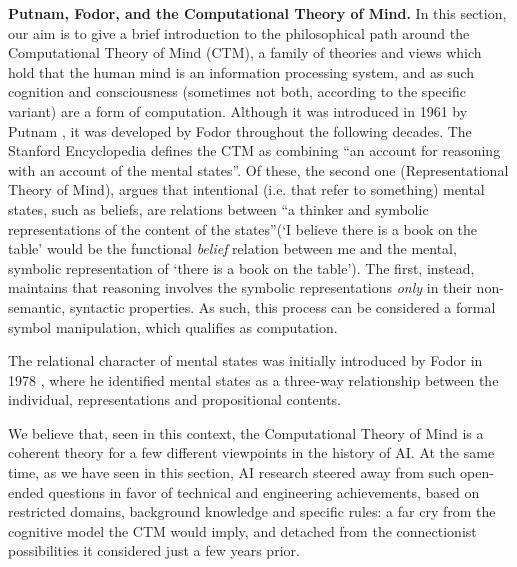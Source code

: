 \documentclass[../main.tex]{subfiles}
\begin{document}
\vspace{4pt}
\textbf{Putnam, Fodor, and the Computational Theory of Mind.}
In this section, our aim is to give a brief introduction to the philosophical path around the Computational Theory of Mind (CTM), a family of theories and views which hold that the human mind is an information processing system, and as such cognition and consciousness (sometimes not both, according to the specific variant) are a form of computation. Although it was introduced in 1961 by Putnam  \parencite{horstComputationalTheoryMind2003}, it was developed by Fodor throughout the following decades. The Stanford Encyclopedia defines the CTM as combining ``an account for reasoning with an account of the mental states''. Of these, the second one (Representational Theory of Mind), argues that intentional (i.e. that refer to something) mental states, such as beliefs, are relations between ``a thinker and symbolic representations of the content of the states''(`I believe there is a book on the table' would be the functional \textit{belief} relation between me and the mental, symbolic representation of `there is a book on the table'). The first, instead, maintains that reasoning involves the symbolic representations \textit{only} in their non-semantic, syntactic properties. As such, this process can be considered a formal symbol manipulation, which qualifies as computation.

The relational character of mental states was initially introduced by Fodor in 1978 \parencite{fodorPropositionalAttitudes1978}, where he identified mental states as a three-way relationship between the individual, representations and propositional contents.

\vspace{5pt}
We believe that, seen in this context, the Computational Theory of Mind is a coherent theory for a few different viewpoints in the history of AI. At the same time, as we have seen in this section, AI research steered away from such open-ended questions in favor of technical and engineering achievements, based on restricted domains, background knowledge and specific rules: a far cry from the cognitive model the CTM would imply, and detached from the connectionist possibilities it considered just a few years prior.
\end{document}
